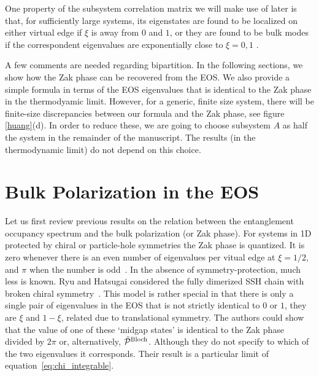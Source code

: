 \documentclass[twocolumn,amsmath,longbibliography,amssymb,superscriptaddress]{revtex4-1}
\newcommand{\mariac}[1]{{\it\color{cyan}#1}}
\begin{document}
One property of the subsystem correlation matrix we will make use of later is that, for sufficiently large systems, its eigenstates are found to be localized on either virtual edge if $\xi$ is away from $0$ and $1$, or they are found to be bulk modes if the correspondent eigenvalues are exponentially close to $\xi = 0,1$ \cite{Peschel2008}.




A few comments are needed regarding  bipartition. 
In the following sections, we show how the Zak phase can be recovered from the EOS.
We also provide a simple formula in terms of the EOS eigenvalues that is identical to the Zak phase in the thermodyamic limit.  
However, for a generic, finite size system, there will be finite-size discrepancies between our formula and the Zak phase, see figure \ref{huang}(d). 
In order to reduce these, we are going to choose subsystem $A$ as half the system in the remainder of the manuscript.
The results (in the thermodynamic limit) do not depend on this choice. 
\section{Bulk Polarization in the EOS}

Let us first review previous results on the relation between the entanglement occupancy spectrum and the bulk polarization (or Zak phase). 
For systems in 1D protected by chiral or particle-hole symmetries the Zak phase is quantized. It is zero whenever there is an even number  of eigenvalues per vitual edge at $\xi = 1/2$, and $\pi$ when the number is odd~\cite{Asboth2016}. 
In the absence of symmetry-protection, much less is known. 
Ryu and Hatsugai considered the fully dimerized SSH chain with broken chiral symmetry~\cite{Ryu2006}.  
This model is rather special in that there is only a single pair of eigenvalues in the EOS that is not strictly identical to $0$ or $1$, they are $\xi$ and $1-\xi$, related due to translational symmetry. 
The authors could show that the value of one of these `midgap states' is identical to the Zak phase divided by $2\pi$ or, alternatively, $\tilde{\mathcal{P}}^{\rm Bloch}$. Although they do not specify to which of the two eigenvalues it corresponds. 
Their result is a particular limit of equation~\eqref{eq:chi_integrable}. 
%
\end{document}
